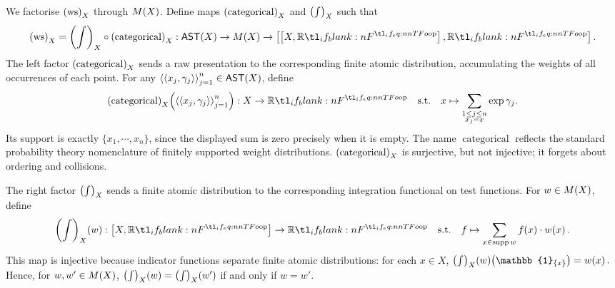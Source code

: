 \documentclass[11pt,a4paper]{article}
\theoremstyle{definition}
\theoremstyle{remark}
\providecommand{\AST}{\mathsf{AST}}
\providecommand{\supp}{\operatorname{supp}}
\providecommand{\indicator}[1]{\mathbb{1}_{#1}}
\providecommand{\categ}{\operatorname{categorical}}
\providecommand{\iwrt}{\int}
\providecommand{\ws}{\operatorname{ws}}
\begin{document}
We factorise \( \Nat[nn]{ \ws }{ X } \) through
\( \Fun[nn]{ M }{ X } \). Define maps
\( \Nat[nn]{ \categ }{ X } \) and \( \Nat[nn]{ \iwrt }{ X } \) such that
\begin{equation*}
	\Nat[nn]{ \ws }{ X } = \Nat[nn]{ \iwrt }{ X } \circ \Nat[nn]{ \categ }{ X }:
	\Fun[nn]{ \AST }{ X }
	\to
	\Fun[nn]{ M }{ X }
	\to
	\inthom{\inthom{X}{\R}}{\R}.
\end{equation*}
The left factor \( \Nat[nn]{ \categ }{ X } \) sends a raw
presentation to the corresponding finite atomic distribution, accumulating the
weights of all occurrences of each point. For any
\( \tuple{\tuple{x_{j}, \gamma_{j}}}_{j = 1}^{n} \in \Fun[nn]{ \AST }{ X } \),
define
\begin{equation}
	\label{eq:categorical-definition-in-set}
	\fn[n]{ \Nat[nn]{ \categ }{ X } }{
		\tuple{\tuple{x_{j}, \gamma_{j}}}_{j = 1}^{n}
	}:
	X \to \R
	\qq{s.t.}
	x \mapsto \sum_{\substack{1 \le j \le n \\ x_{j} = x}} \exp \gamma_{j}.
\end{equation}
Its support is exactly \( \{x_{1},\cdots,x_{n}\} \), since the displayed sum
is zero precisely when it is empty. The name \( \categ \) reflects the standard
probability theory nomenclature of finitely supported weight distributions.
\( \Nat[nn]{ \categ }{ X } \) is surjective, but not injective; it forgets about ordering and collisions.

The right factor \( \Nat[nn]{ \iwrt }{ X } \) sends a finite atomic
distribution to the corresponding integration functional on test functions.
For \( w \in \Fun[nn]{ M }{ X } \), define
\begin{equation}
	\label{eq:iwrt-definition-in-set}
	\fn[n]{ \Nat[nn]{ \iwrt }{ X } }{ w }:
	\inthom{X}{\R} \to \R
	\qq{s.t.}
	f \mapsto \sum_{x \in \supp w} \fn[n]{ f }{ x } \cdot \fn[n]{ w }{ x }.
\end{equation}
This map is injective because indicator functions separate finite atomic
distributions: for each \(x\in X\),
\(
\fn[p]{ \fn[n]{ \Nat[nn]{ \iwrt }{ X } }{ w } }{
	\indicator{\left\{ x \right\}}
}
=
\fn[n]{w}{x}.
\)
Hence, for \( w,w'\in\Fun[nn]{M}{X} \),
\( \fn[n]{ \Nat[nn]{ \iwrt }{ X } }{ w }
=
\fn[n]{ \Nat[nn]{ \iwrt }{ X } }{ w' } \) if and only if \( w=w' \).
\end{document}
